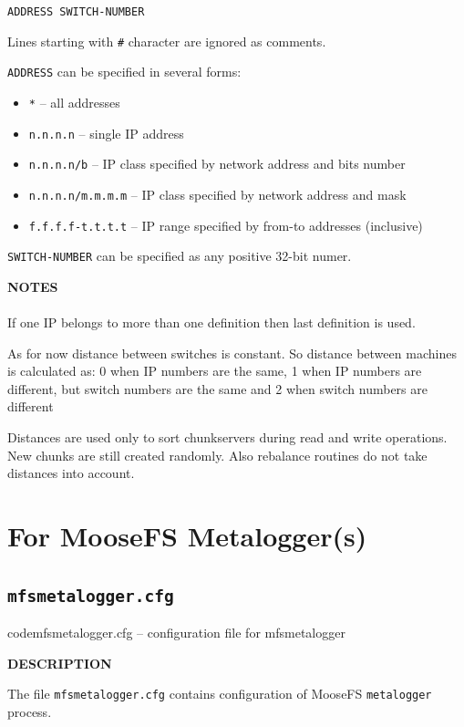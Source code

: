 \documentclass[a4paper,11pt,english]{report}
\def\code#1{\texttt{#1}}
\begin{document}
					\code{ADDRESS SWITCH-NUMBER}

					Lines starting with \code{\#} character are ignored as comments.

					\code{ADDRESS} can be specified in several forms:

					\begin{itemize}
						\item \code{*}			-- all addresses
						\item \code{n.n.n.n}		-- single IP address
						\item \code{n.n.n.n/b}		-- IP class specified by network address and bits number
						\item \code{n.n.n.n/m.m.m.m}	-- IP class specified by network address and mask
						\item \code{f.f.f.f-t.t.t.t}	-- IP range specified by from-to addresses (inclusive)
					\end{itemize}

					\code{SWITCH-NUMBER} can be specified as any positive 32-bit numer.


				\textbf{NOTES} \\\\
					If one IP belongs to more than one definition then last  definition  is
					used.

					As  for  now distance between switches is constant. So distance between
					machines is calculated as: 0 when IP numbers are the same,  1  when  IP
					numbers  are  different,  but  switch  numbers  are the same and 2 when
					switch numbers are different

					Distances are used only to sort  chunkservers  during  read  and  write
					operations.  New chunks are still created randomly. Also rebalance
					routines do not take distances into account.
			
			
		\section{For MooseFS Metalogger(s)}
			\subsection{\code{mfsmetalogger.cfg}}
				code{mfsmetalogger.cfg} -- configuration file for mfsmetalogger
				\bigskip
				
				\textbf{DESCRIPTION}
				
					The file \code{mfsmetalogger.cfg} contains configuration of MooseFS \code{metalogger} process.
				\bigskip
				
\end{document}
